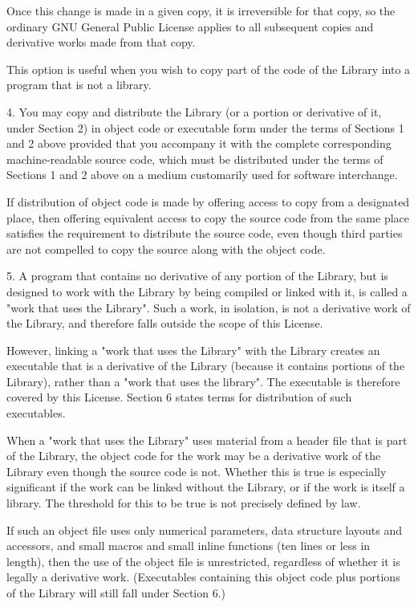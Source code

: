 \documentclass[twoside]{tceusermanual}
\begin{document}
Once this change is made in a given copy, it is irreversible for
that copy, so the ordinary GNU General Public License applies to
all subsequent copies and derivative works made from that copy.

This option is useful when you wish to copy part of the code of
the Library into a program that is not a library.

4. You may copy and distribute the Library (or a portion or
derivative of it, under Section 2) in object code or executable
form under the terms of Sections 1 and 2 above provided that you
accompany it with the complete corresponding machine-readable
source code, which must be distributed under the terms of
Sections 1 and 2 above on a medium customarily used for software
interchange.

If distribution of object code is made by offering access to
copy from a designated place, then offering equivalent access to
copy the source code from the same place satisfies the
requirement to distribute the source code, even though third
parties are not compelled to copy the source along with the
object code.

5. A program that contains no derivative of any portion of the
Library, but is designed to work with the Library by being
compiled or linked with it, is called a "work that uses the
Library".  Such a work, in isolation, is not a derivative work
of the Library, and therefore falls outside the scope of this
License.

However, linking a "work that uses the Library" with the Library
creates an executable that is a derivative of the Library
(because it contains portions of the Library), rather than a
"work that uses the library".  The executable is therefore
covered by this License. Section 6 states terms for distribution
of such executables.

When a "work that uses the Library" uses material from a header
file that is part of the Library, the object code for the work
may be a derivative work of the Library even though the source
code is not. Whether this is true is especially significant if
the work can be linked without the Library, or if the work is
itself a library.  The threshold for this to be true is not
precisely defined by law.

If such an object file uses only numerical parameters, data
structure layouts and accessors, and small macros and small
inline functions (ten lines or less in length), then the use of
the object file is unrestricted, regardless of whether it is
legally a derivative work.  (Executables containing this object
code plus portions of the Library will still fall under Section
6.)
\end{document}
